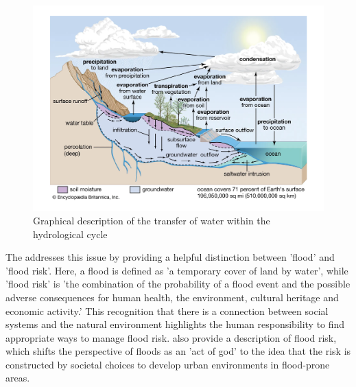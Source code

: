 \begin{figure}
\centering\includegraphics[width=1.0\linewidth]{Content/Figures/02_Literature_Review/hydrological-cycle.pdf}
\caption{Graphical description of the transfer of water within the hydrological cycle}
\label{fig:hydrocycle}
\end{figure}

The \textcite{EUDirective2007} addresses this issue by providing a helpful
distinction between 'flood' and 'flood risk'. Here, a flood is defined as 'a
temporary cover of land by water', while 'flood risk' is 'the combination of the
probability of a flood event and the possible adverse consequences for human
health, the environment, cultural heritage and economic activity.' This
recognition that there is a connection between social systems and the natural
environment highlights the human responsibility to find appropriate ways to
manage flood risk. \textcite{wang2022review} also provide a description of flood
risk, which shifts the perspective of floods as an 'act of god' to the idea that
the risk is constructed by societal choices to develop urban environments in
flood-prone areas. 

